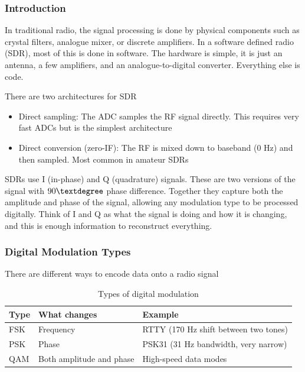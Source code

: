 \documentclass{article}
\begin{document}
\subsubsection{Introduction}
In traditional radio, the signal processing is done by physical components such as crystal filters, analogue mixer, or discrete amplifiers. In a software defined radio (SDR), most of this is done in software. The hardware is simple, it is just an antenna, a few amplifiers, and an analogue-to-digital converter. Everything else is code.

There are two architectures for SDR
\begin{itemize}
    \item Direct sampling: The ADC samples the RF signal directly. This requires very fast ADCs but is the simplest architecture
    \item Direct conversion (zero-IF): The RF is mixed down to baseband (0 Hz) and then sampled. Most common in amateur SDRs
\end{itemize}

SDRs use I (in-phase) and Q (quadrature) signals. These are two versions of the signal with $90\textdegree$ phase difference. Together they capture both the amplitude and phase of the signal, allowing any modulation type to be processed digitally. Think of I and Q as what the signal is doing and how it is changing, and this is enough information to reconstruct everything.

\subsubsection{Digital Modulation Types}
There are different ways to encode data onto a radio signal
\begin{table}[h]
    \centering
    \caption{Types of digital modulation}
    \label{tab:14}
    \begin{tabular}{l|l|l}
        Type & What changes & Example \\
        \hline
        \hline
        FSK & Frequency & RTTY (170 Hz shift between two tones) \\
        PSK & Phase & PSK31 (31 Hz bandwidth, very narrow) \\
        QAM & Both amplitude and phase & High-speed data modes
    \end{tabular}
\end{table}
\end{document}
